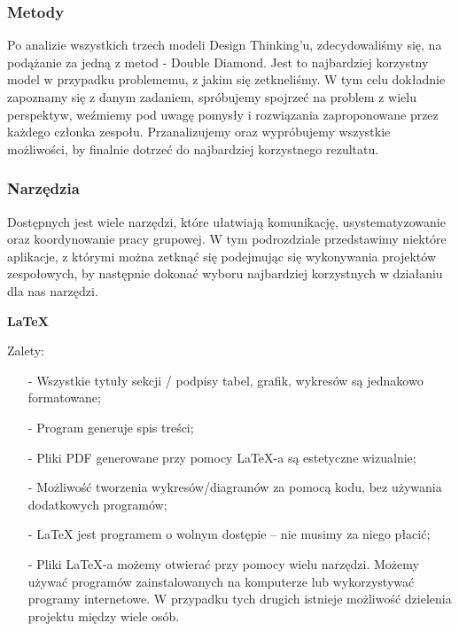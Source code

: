 \documentclass[a4paper,titleauthor]{mwart}
\begin{document}
\subsubsection{Metody}
\label{sec:narzędzia}
Po analizie wszystkich trzech modeli Design Thinking'u, zdecydowaliśmy się, na podążanie za jedną z metod - Double Diamond. Jest to najbardziej korzystny model w przypadku problememu, z jakim się zetkneliśmy. W tym celu dokładnie zapoznamy się z danym zadaniem, spróbujemy spojrzeć na problem z wielu perspektyw, weźmiemy pod uwagę pomysły i rozwiązania zaproponowane przez każdego członka zespołu. Przanalizujemy oraz wypróbujemy wszystkie możliwości, by finalnie dotrzeć do najbardziej korzystnego rezultatu. 

\vspace{1cm}
\subsubsection{Narzędzia}
\label{sec:narzędzia}


Dostępnych jest wiele narzędzi, które ułatwiają komunikację, usystematyzowanie oraz koordynowanie pracy grupowej. W tym podrozdziale przedstawimy niektóre aplikacje, z którymi można zetknąć się podejmując się wykonywania projektów zespołowych, by następnie dokonać wyboru najbardziej korzystnych w działaniu dla nas narzędzi. \newline \newline

 \newline 

\textbf{LaTeX} \newline
\indent

Zalety:
\begin{itemize}

\item[-]
Wszystkie tytuły sekcji / podpisy tabel, grafik, wykresów są jednakowo formatowane;

\item[-]
Program generuje spis treści;

\item[-]
Pliki PDF generowane przy pomocy LaTeX-a są estetyczne wizualnie;

\item[-]
Możliwość tworzenia wykresów/diagramów za pomocą kodu, bez używania dodatkowych programów; 

\item[-]
LaTeX jest programem o wolnym dostępie – nie musimy za niego płacić;

\item[-]
Pliki LaTeX-a możemy otwierać przy pomocy wielu narzędzi. Możemy używać programów zainstalowanych na komputerze lub wykorzystywać programy internetowe. W przypadku tych drugich istnieje możliwość dzielenia projektu między wiele osób. 
\end{itemize}
\end{document}

